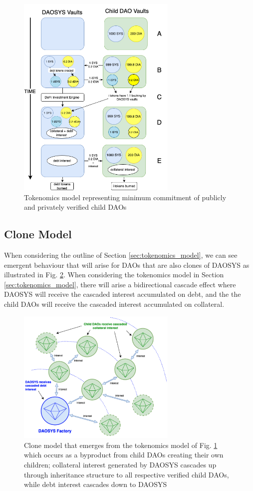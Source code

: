 \documentclass[journal,twocolumn,12pt]{ieeesyscoin}
\begin{document}
\begin{figure}[h!]
\includegraphics[width=3in]{img/tokenomics_model.png}
\caption{Tokenomics model representing minimum commitment of publicly and privately verified child DAOs} 
\label{fig:tokenomics_model}
\end{figure} 

\subsection{Clone Model}
\label{sec:clone_model}

When considering the outline of Section \ref{sec:tokenomics_model}, we can see emergent behaviour that will arise for DAOs that are also clones of DAOSYS as illustrated in Fig. \ref{fig:clone_model}. When considering the tokenomics model in Section 
\ref{sec:tokenomics_model}, there will arise a bidirectional cascade effect where DAOSYS will receive the cascaded interest accumulated on debt, and the the child DAOs will receive the cascaded interest accumulated on collateral.

\begin{figure}[h!]
\includegraphics[width=3in]{img/clone_model.png}
\caption{Clone model that emerges from the tokenomics model of Fig. \ref{fig:tokenomics_model} which occurs as a byproduct from child DAOs creating their own children; collateral interest generated by DAOSYS cascades up through inheritance structure to all respective verified child DAOs, while debt interest cascades down to DAOSYS} 
\label{fig:clone_model}
\end{figure} 
\end{document}
